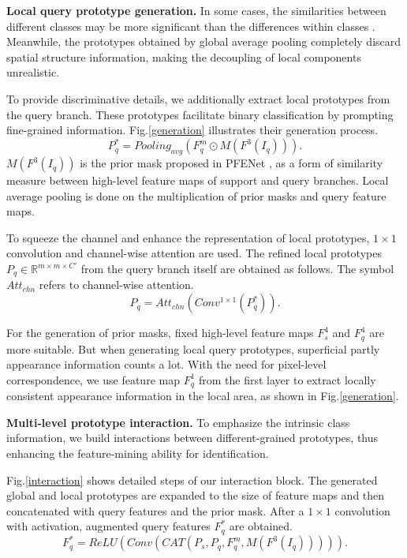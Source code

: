 \documentclass[letterpaper]{article} %
\begin{document}
\textbf{Local query prototype generation.}
In some cases, the similarities between different classes may be more significant than the differences within classes \cite{fan2022self}. Meanwhile, the prototypes obtained by global average pooling completely discard spatial structure information, making the decoupling of local components unrealistic.

To provide discriminative details, we additionally extract local prototypes from the query branch. These prototypes facilitate binary classification by prompting fine-grained information. Fig.\ref{generation} illustrates their generation process.
\begin{equation}
            P^*_{q} = Pooling_{avg}(F^{m}_q \odot M(F^3(I_q))).
\end{equation}%
$M(F^3(I_q))$ is the prior mask proposed in PFENet \cite{tian2020prior}, as a form of similarity measure between high-level feature maps of support and query branches. Local average pooling is done on the multiplication of prior masks and query feature maps.

To squeeze the channel and enhance the representation of local prototypes, $1\times1$ convolution and channel-wise attention are used. The refined local prototypes $P_{q} \in \mathbb{R}^{m\times m\times C'}$ from the query branch itself are obtained as follows. The symbol $Att_{chn}$ refers to channel-wise attention.
\begin{equation}
            P_{q} = Att_{chn}(Conv^{1\times 1}(P^*_{q})).
\end{equation}%

For the generation of prior masks, fixed high-level feature maps $F^{4}_{s}$ and $F^{4}_{q}$ are more suitable. But when generating local query prototypes, superficial partly appearance information counts a lot. With the need for pixel-level correspondence, we use feature map $F^{1}_{q}$ from the first layer to extract locally consistent appearance information in the local area, as shown in Fig.\ref{generation}.

\textbf{Multi-level prototype interaction.}
To emphasize the intrinsic class information, we build interactions between different-grained prototypes, thus enhancing the feature-mining ability for identification.

Fig.\ref{interaction} shows detailed steps of our interaction block. The generated global and local prototypes are expanded to the size of feature maps and then concatenated with query features and the prior mask. After a $1\times1$ convolution with activation, augmented query features $F^{*}_q$ are obtained.
\begin{equation}
	 F^{*}_q = ReLU(Conv(CAT(P_s,P_q,F^{m}_q,M(F^3(I_q))))).
\end{equation}%
\end{document}
